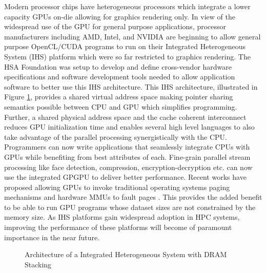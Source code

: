 \par Modern processor chips have heterogeneous processors which integrate a lower capacity GPUs on-die allowing for graphics rendering only. In view of the widespread use of the GPU for general purpose applications, processor manufacturers including AMD\cite{amd-apu}, Intel\cite{inteliris}, and NVIDIA\cite{denver} are beginning to allow general purpose OpenCL\cite{opencl}/CUDA\cite{cuda} programs to run on their Integrated Heterogeneous System (IHS) platform which were so far restricted to graphics rendering. The HSA Foundation \cite{hsafoundation} was setup to develop and define cross-vendor hardware specifications and software development tools needed to allow application software to better use this IHS architecture. This IHS architecture, illustrated in Figure \ref{hsa-arch}, provides a shared virtual address space making pointer sharing semantics possible between CPU and GPU which simplifies programming. Further, a shared physical address space and the cache coherent interconnect reduces GPU initialization time and enables several high level languages \cite{sumatra,julia} to also take advantage of the parallel processing synergistically with the CPU. Programmers can now write applications that seamlessly integrate CPUs with GPUs while benefiting from best attributes of each. Fine-grain parallel stream processing like face detection, compression, encryption-decryption etc. can now use the integrated GPGPU to deliver better performance. Recent works have proposed allowing GPUs to invoke traditional operating systems paging mechanisms and hardware MMUs to fault pages \cite{tlb-translation}. This provides the added benefit to be able to run GPU programs whose dataset sizes are not constrained by the memory size. As IHS platforms gain widespread adoption in HPC systems, improving the performance of these platforms will become of paramount importance in the near future. \cite{apu-exascale,amd-exascale1}


\begin{figure}[!htb]
    \centering
    \hsacpu
    \caption{Architecture of a Integrated Heterogeneous System with DRAM Stacking}
    \label{hsa-arch}
\end{figure}

